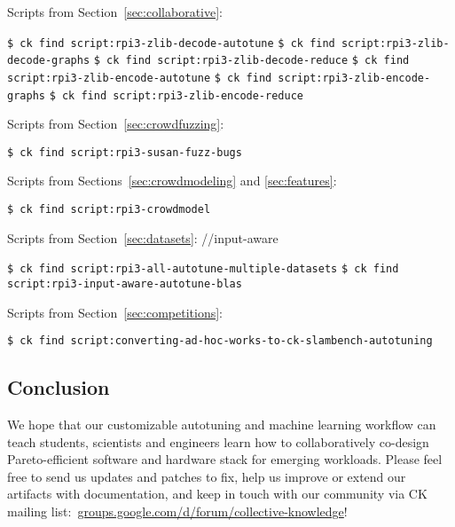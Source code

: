 Scripts from Section~\ref{sec:collaborative}:

\begin{flushleft}
\texttt{\$ ck find script:rpi3-zlib-decode-autotune} \newline
\texttt{\$ ck find script:rpi3-zlib-decode-graphs} \newline
\texttt{\$ ck find script:rpi3-zlib-decode-reduce} \newline
\texttt{\$ ck find script:rpi3-zlib-encode-autotune} \newline
\texttt{\$ ck find script:rpi3-zlib-encode-graphs} \newline
\texttt{\$ ck find script:rpi3-zlib-encode-reduce} \newline
\end{flushleft}

Scripts from Section~\ref{sec:crowdfuzzing}:

\begin{flushleft}
\texttt{\$ ck find script:rpi3-susan-fuzz-bugs} \newline
\end{flushleft}

Scripts from Sections~\ref{sec:crowdmodeling} and \ref{sec:features}:

\begin{flushleft}
\texttt{\$ ck find script:rpi3-crowdmodel} \newline
\end{flushleft}

Scripts from Section~\ref{sec:datasets}: //input-aware

\begin{flushleft}
\texttt{\$ ck find script:rpi3-all-autotune-multiple-datasets} \newline
\texttt{\$ ck find script:rpi3-input-aware-autotune-blas} \newline
\end{flushleft}

Scripts from Section~\ref{sec:competitions}:

\begin{flushleft}
\texttt{\$ ck find script:converting-ad-hoc-works-to-ck-slambench-autotuning} \newline
\end{flushleft}


\subsection{Conclusion}

We hope that our customizable autotuning and machine learning workflow 
can teach students, scientists and engineers learn how to collaboratively
co-design Pareto-efficient software and hardware stack for emerging workloads.
%
Please feel free to send us updates and patches to fix, help us improve or extend
our artifacts with documentation, and keep in touch with our community via
CK mailing list:~\href{https://groups.google.com/d/forum/collective-knowledge}{groups.google.com/d/forum/collective-knowledge}!
